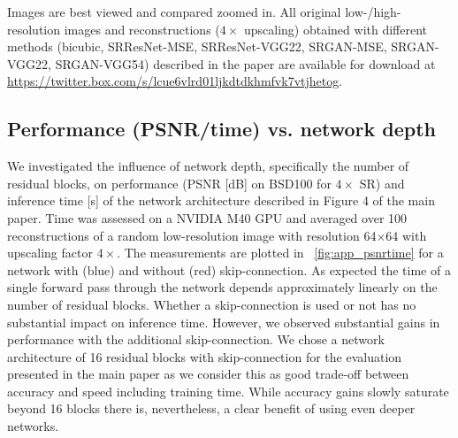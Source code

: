 \documentclass[10pt,twocolumn,letterpaper]{article}
\begin{document}
Images are best viewed and compared zoomed in. All original low-/high-resolution images and reconstructions ($4\times$ upscaling) obtained with different methods (bicubic, SRResNet-MSE, SRResNet-VGG22, SRGAN-MSE, SRGAN-VGG22, SRGAN-VGG54) described in the paper are available for download at \url{https://twitter.box.com/s/lcue6vlrd01ljkdtdkhmfvk7vtjhetog}.

\clearpage

\subsection{Performance (PSNR/time) vs. network depth}
\label{app:performance}
We investigated the influence of network depth, specifically the number of residual blocks, on performance (PSNR [dB] on BSD100 for $4\times$ SR) and inference time [s] of the network architecture described in Figure 4 of the main paper. Time was assessed on a NVIDIA M40 GPU and averaged over 100 reconstructions of a random low-resolution image with resolution 64$\times$64 with upscaling factor $4\times$. The measurements are plotted in \figurename~\ref{fig:app_psnrtime} for a network with (blue) and without (red) skip-connection.
As expected the time of a single forward pass through the network depends approximately linearly on the number of residual blocks. Whether a skip-connection is used or not has no substantial impact on inference time. However, we observed substantial gains in performance with the additional skip-connection. We chose a network architecture of 16 residual blocks with skip-connection for the evaluation presented in the main paper as we consider this as good trade-off between accuracy and speed including training time. While accuracy gains slowly saturate beyond 16 blocks there is, nevertheless, a clear benefit of using even deeper networks.
\end{document}
